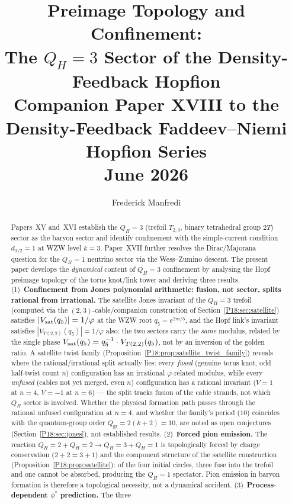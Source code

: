 \documentclass[11pt,a4paper]{article}
\title{\textbf{Preimage Topology and Confinement:\\
The $Q_H=3$ Sector of the Density-Feedback Hopfion}
\\[0.6em]
{\large Companion Paper XVIII to the Density-Feedback
Faddeev--Niemi Hopfion Series}
\\[0.6em]
\large June 2026}
\author{Frederick Manfredi}
\date{}
\theoremstyle{definition}\newtheorem{definition}[theorem]{Definition}
\theoremstyle{remark}
\newcommand{\vp}{\varphi}
\newcommand{\twoT}{2T}
\newcommand{\QH}{Q_H}
\newcommand{\dimq}[1]{d_{#1}}
\newcommand{\Jones}{V}
\newcommand{\phistar}{\phi^*}
\begin{document}
\maketitle

\begin{abstract}
Papers~XV and~XVI establish the $\QH=3$ (trefoil $T_{2,3}$, binary
tetrahedral group $\twoT$) sector as the baryon sector and identify
confinement with the simple-current condition $\dimq{3/2}=1$ at
WZW level $k=3$.  Paper~XVII further resolves the Dirac/Majorana
question for the $\QH=1$ neutrino sector via the Wess--Zumino descent.
The present paper develops the \emph{dynamical} content of $\QH=3$
confinement by analysing the Hopf preimage topology of the torus
knot/link tower and deriving three results.
(1)~\textbf{Confinement from Jones polynomial arithmetic: fusion, not sector, splits rational from irrational.}
The satellite Jones invariant of the $\QH=3$ trefoil (computed via
the $(2,3)$-cable/companion construction of Section~\ref{P18:sec:satellite})
satisfies $|\Jones_{\rm sat}(q_5)|=1/\vp$ at the WZW root $q_5=e^{2\pi i/5}$,
and the Hopf link's invariant satisfies $|\Jones_{T(2,2)}(q_5)|=1/\vp$
also: the two sectors carry the \emph{same} modulus, related by the
single phase $\Jones_{\rm sat}(q_5)=q_5^{-1}\cdot\Jones_{T(2,2)}(q_5)$,
not by an inversion of the golden ratio.
A satellite twist family (Proposition~\ref{P18:prop:satellite_twist_family})
reveals where the rational/irrational split actually lies: every
\emph{fused} (genuine torus knot, odd half-twist count $n$)
configuration has an irrational $\vp$-related modulus, while every
\emph{unfused} (cables not yet merged, even $n$) configuration has a
rational invariant ($V=1$ at $n=4$, $V=-1$ at $n=6$) --- the split
tracks fusion of the cable strands, not which $\QH$ sector is
involved. Whether the physical formation path passes through the
rational unfused configuration at $n=4$, and whether the family's
period ($10$) coincides with the quantum-group order
$Q_{\mathrm{gr}}=2(k+2)=10$, are noted as open conjectures
(Section~\ref{P18:sec:jones}), not established results.
(2)~\textbf{Forced pion emission.}  The reaction
$\QH=2+\QH=2\to\QH=3+\QH=1$ is topologically forced by charge
conservation ($2+2=3+1$) and the component structure of the
satellite construction (Proposition~\ref{P18:prop:satellite}):
of the four initial circles, three fuse into the trefoil and
one cannot be absorbed, producing the $\QH=1$ spectator.
Pion emission in baryon formation is therefore a topological
necessity, not a dynamical accident.
(3)~\textbf{Process-dependent $\phistar$ prediction.}  The three

\end{abstract}
\end{document}
